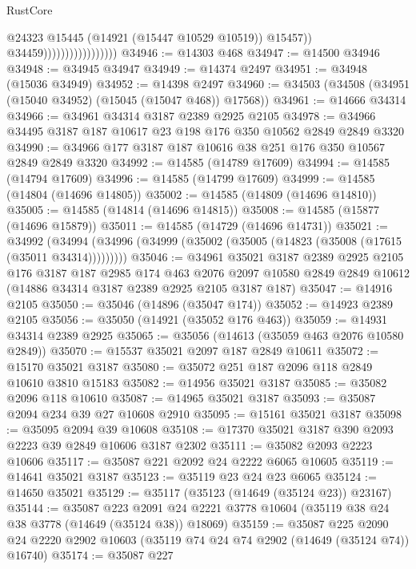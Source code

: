 \begin{lexlean}{RustCore}
\begin{coremodule}
                                          @24323
                                          @15445
                                          (@14921 (@15447 @10529 @10519))
                                          @15457))
                                      @34459)))))))))))))))))
@34946 := @14303 @468
@34947 := @14500 @34946
@34948 := @34945 @34947
@34949 := @14374 @2497
@34951 := @34948 (@15036 @34949)
@34952 := @14398 @2497
@34960 := @34503 (@34508 (@34951 (@15040 @34952) (@15045 (@15047 @468)) @17568))
@34961 := @14666 @34314
@34966 := @34961 @34314 @3187 @2389 @2925 @2105
@34978 := @34966 @34495 @3187 @187 @10617 @23 @198 @176 @350 @10562 @2849 @2849 @3320
@34990 := @34966 @177 @3187 @187 @10616 @38 @251 @176 @350 @10567 @2849 @2849 @3320
@34992 := @14585 (@14789 @17609)
@34994 := @14585 (@14794 @17609)
@34996 := @14585 (@14799 @17609)
@34999 := @14585 (@14804 (@14696 @14805))
@35002 := @14585 (@14809 (@14696 @14810))
@35005 := @14585 (@14814 (@14696 @14815))
@35008 := @14585 (@15877 (@14696 @15879))
@35011 := @14585 (@14729 (@14696 @14731))
@35021 := @34992
    (@34994 (@34996 (@34999 (@35002 (@35005 (@14823 (@35008 (@17615 (@35011 @34314)))))))))
@35046 := @34961
    @35021
    @3187
    @2389
    @2925
    @2105
    @176
    @3187
    @187
    @2985
    @174
    @463
    @2076
    @2097
    @10580
    @2849
    @2849
    @10612
    (@14886 @34314 @3187 @2389 @2925 @2105 @3187 @187)
@35047 := @14916 @2105
@35050 := @35046 (@14896 (@35047 @174))
@35052 := @14923 @2389 @2105
@35056 := @35050 (@14921 (@35052 @176 @463))
@35059 := @14931 @34314 @2389 @2925
@35065 := @35056 (@14613 (@35059 @463 @2076 @10580 @2849))
@35070 := @15537 @35021 @2097 @187 @2849 @10611
@35072 := @15170 @35021 @3187
@35080 := @35072 @251 @187 @2096 @118 @2849 @10610 @3810 @15183
@35082 := @14956 @35021 @3187
@35085 := @35082 @2096 @118 @10610
@35087 := @14965 @35021 @3187
@35093 := @35087 @2094 @234 @39 @27 @10608 @2910
@35095 := @15161 @35021 @3187
@35098 := @35095 @2094 @39 @10608
@35108 := @17370 @35021 @3187 @390 @2093 @2223 @39 @2849 @10606 @3187 @2302
@35111 := @35082 @2093 @2223 @10606
@35117 := @35087 @221 @2092 @24 @2222 @6065 @10605
@35119 := @14641 @35021 @3187
@35123 := @35119 @23 @24 @23 @6065
@35124 := @14650 @35021
@35129 := @35117 (@35123 (@14649 (@35124 @23)) @23167)
@35144 := @35087
    @223
    @2091
    @24
    @2221
    @3778
    @10604
    (@35119 @38 @24 @38 @3778 (@14649 (@35124 @38)) @18069)
@35159 := @35087
    @225
    @2090
    @24
    @2220
    @2902
    @10603
    (@35119 @74 @24 @74 @2902 (@14649 (@35124 @74)) @16740)
@35174 := @35087
    @227

\end{coremodule}
\end{lexlean}
